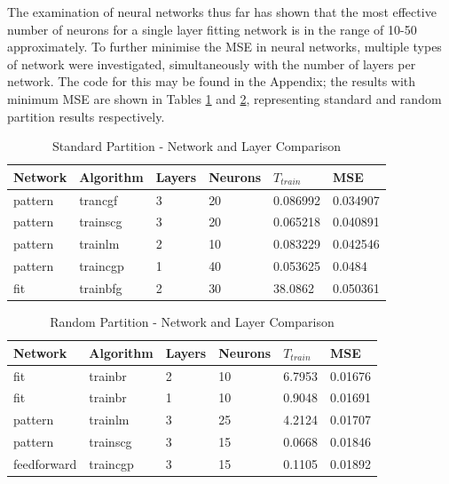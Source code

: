 \documentclass[a4paper, 10pt, conference]{ieeeconf}
\begin{document}

The examination of neural networks thus far has shown that the most effective number of neurons for a single layer fitting network is in the range of 10-50 approximately. To further minimise the MSE in neural networks, multiple types of network were investigated, simultaneously with the number of layers per network. The code for this may be found in the Appendix; the results with minimum MSE are shown in Tables \ref{tbl:unmixed_networks} and \ref{tbl:mixed_networks}, representing standard and random partition results respectively.

\begin{table}
\centering
\caption{Standard Partition - Network and Layer Comparison}
\label{tbl:unmixed_networks}
\begin{tabular}{llllll}
\hline
\textbf{Network} & \textbf{Algorithm} & \textbf{Layers} & \textbf{Neurons} & \textbf{$T_{train}$} & \textbf{MSE} \\ \hline
pattern & trancgf & 3 & 20 & 0.086992 & 0.034907 \\ \hline
pattern & trainscg & 3 & 20 & 0.065218 & 0.040891 \\ \hline
pattern & trainlm & 2 & 10 & 0.083229 & 0.042546 \\ \hline
pattern & traincgp & 1 & 40 & 0.053625 & 0.0484 \\ \hline
fit & trainbfg & 2 & 30 & 38.0862 & 0.050361 \\ \hline
\end{tabular}
\end{table}

\begin{table}
\centering
\caption{Random Partition - Network and Layer Comparison}
\label{tbl:mixed_networks}
\begin{tabular}{llllll}
\hline
\textbf{Network} & \textbf{Algorithm} & \textbf{Layers} & \textbf{Neurons} & \textbf{$T_{train}$} & \textbf{MSE} \\ \hline
fit & trainbr & 2 & 10 & 6.7953 & 0.01676 \\ \hline
fit & trainbr & 1 & 10 & 0.9048 & 0.01691 \\ \hline
pattern & trainlm & 3 & 25 & 4.2124 & 0.01707 \\ \hline
pattern & trainscg & 3 & 15 & 0.0668& 0.01846 \\ \hline
feedforward & traincgp & 3 & 15 & 0.1105 & 0.01892 \\ \hline
\end{tabular}
\end{table}
\end{document}
